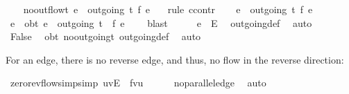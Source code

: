 \begin{isabellebody}
%
\endisatagproof
{\isafoldproof}%
%
\isadelimproof
\isanewline
%
\endisadelimproof
\ \ \isanewline
{}\isamarkupfalse%
\ no{\isacharunderscore}outflow{\isacharunderscore}t{\isacharcolon}\ {\isachardoublequoteopen}{\isasymforall}e\ {\isasymin}\ outgoing\ t{\isachardot}\ f\ e\ {\isacharequal}\ {}{\isachardoublequoteclose}\isanewline
%
\isadelimproof
%
\endisadelimproof
%
\isatagproof
{}\isamarkupfalse%
\ {\isacharparenleft}rule\ ccontr{\isacharparenright}\isanewline
\ \ \isamarkupfalse%
\ {\isachardoublequoteopen}{\isasymnot}{\isacharparenleft}{\isasymforall}e\ {\isasymin}\ outgoing\ t{\isachardot}\ f\ e\ {\isacharequal}\ {}{\isacharparenright}{\isachardoublequoteclose}\isanewline
\ \ \isamarkupfalse%
\ \isamarkupfalse%
\ e\ \ obt{}{\isacharcolon}\ {\isachardoublequoteopen}e\ {\isasymin}\ outgoing\ t\ {\isasymand}\ f\ e\ {\isasymnoteq}\ {}{\isachardoublequoteclose}\ \isamarkupfalse%
\ blast\isanewline
\ \ \isamarkupfalse%
\ \isamarkupfalse%
\ {\isachardoublequoteopen}e\ {\isasymin}\ E{\isachardoublequoteclose}\ \isamarkupfalse%
\ outgoing{\isacharunderscore}def\ \isamarkupfalse%
\ auto\isanewline
\ \ \isamarkupfalse%
\ {\isachardoublequoteopen}False{\isachardoublequoteclose}\ \isamarkupfalse%
\ obt{}\ no{\isacharunderscore}outgoing{\isacharunderscore}t\ outgoing{\isacharunderscore}def\ \isamarkupfalse%
\ auto\isanewline
{}\isamarkupfalse%
%
\endisatagproof
{\isafoldproof}%
%
\isadelimproof
%
\endisadelimproof
%
\begin{isamarkuptext}%
For an edge, there is no reverse edge, and thus, 
  no flow in the reverse direction:%
\end{isamarkuptext}\isamarkuptrue%
\isamarkupfalse%
\ zero{\isacharunderscore}rev{\isacharunderscore}flow{\isacharunderscore}simp{\isacharbrackleft}simp{\isacharbrackright}{\isacharcolon}\ {\isachardoublequoteopen}{\isacharparenleft}u{\isacharcomma}v{\isacharparenright}{\isasymin}E\ {\isasymLongrightarrow}\ f{\isacharparenleft}v{\isacharcomma}u{\isacharparenright}\ {\isacharequal}\ {}{\isachardoublequoteclose}\isanewline
%
\isadelimproof
\ \ %
\endisadelimproof
%
\isatagproof
{}\isamarkupfalse%
\ no{\isacharunderscore}parallel{\isacharunderscore}edge\ \isamarkupfalse%
\ auto%
\endisatagproof
{\isafoldproof}%

\end{isabellebody}
